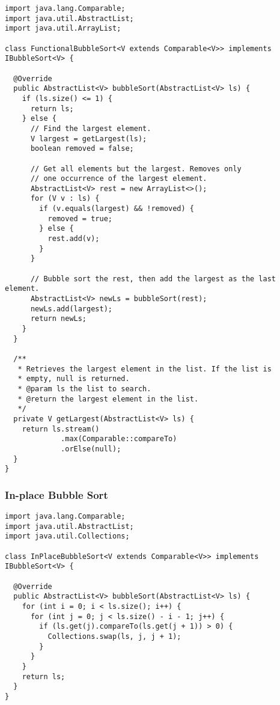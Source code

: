 \begin{lstlisting}[language=MyJava]
import java.lang.Comparable;
import java.util.AbstractList;
import java.util.ArrayList;

class FunctionalBubbleSort<V extends Comparable<V>> implements IBubbleSort<V> {

  @Override
  public AbstractList<V> bubbleSort(AbstractList<V> ls) {
    if (ls.size() <= 1) { 
      return ls; 
    } else {
      // Find the largest element.
      V largest = getLargest(ls);
      boolean removed = false;

      // Get all elements but the largest. Removes only
      // one occurrence of the largest element.
      AbstractList<V> rest = new ArrayList<>();
      for (V v : ls) {
        if (v.equals(largest) && !removed) { 
          removed = true; 
        } else { 
          rest.add(v); 
        }
      }

      // Bubble sort the rest, then add the largest as the last element.
      AbstractList<V> newLs = bubbleSort(rest);
      newLs.add(largest);
      return newLs;
    }
  }

  /**
   * Retrieves the largest element in the list. If the list is 
   * empty, null is returned.
   * @param ls the list to search.
   * @return the largest element in the list.
   */
  private V getLargest(AbstractList<V> ls) {
    return ls.stream()
             .max(Comparable::compareTo)
             .orElse(null);
  }
}
\end{lstlisting}

\newpage %
\subsubsection*{In-place Bubble Sort}
\begin{lstlisting}[language=MyJava]
import java.lang.Comparable;
import java.util.AbstractList;
import java.util.Collections;

class InPlaceBubbleSort<V extends Comparable<V>> implements IBubbleSort<V> {

  @Override
  public AbstractList<V> bubbleSort(AbstractList<V> ls) {
    for (int i = 0; i < ls.size(); i++) {
      for (int j = 0; j < ls.size() - i - 1; j++) {
        if (ls.get(j).compareTo(ls.get(j + 1)) > 0) {
          Collections.swap(ls, j, j + 1);
        }
      }
    }
    return ls;
  }
}
\end{lstlisting}

